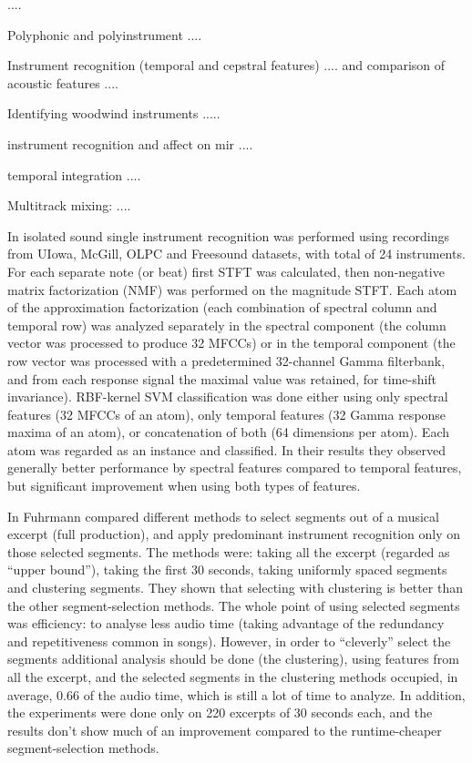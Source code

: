 \documentclass[journal]{IEEEtran}
\begin{document}
\cite{martin1998musical,yu2014sparse}....

Polyphonic and polyinstrument \cite{hamel2009automatic}....

Instrument recognition (temporal and cepstral features) \cite{eronen2000musical}.... and comparison of acoustic features \cite{eronen2001comparison}....

Identifying woodwind instruments \cite{brown2001feature}.....

instrument recognition and affect on mir \cite{kitahara2007computational}....

temporal integration \cite{Joder:09}....

Multitrack mixing: \cite{scottinstrument,scott2011automatic}....

In \cite{tjoa2010musical} isolated sound single instrument recognition was performed using recordings from UIowa, McGill, OLPC and Freesound datasets, with total of 24 instruments.
For each separate note (or beat) first STFT was calculated, then non-negative matrix factorization (NMF) was performed on the magnitude STFT. Each atom of the approximation factorization (each combination of spectral column and temporal row) was analyzed separately in the spectral component (the column vector was processed to produce 32 MFCCs) or in the temporal component (the row vector was processed with a predetermined 32-channel Gamma filterbank, and from each response signal the maximal value was retained, for time-shift invariance). RBF-kernel SVM classification was done either using only spectral features (32 MFCCs of an atom), only temporal features (32 Gamma response maxima of an atom), or concatenation of both (64 dimensions per atom). Each atom was regarded as an instance and classified.
In their results they observed generally better performance by spectral features compared to temporal features, but significant improvement when using both types of features.

In \cite{fuhrmann2011quantifying} Fuhrmann \etal compared different methods to select segments out of a musical excerpt (full production), and apply predominant instrument recognition only on those selected segments. The methods were: taking all the excerpt (regarded as ``upper bound''), taking the first 30 seconds, taking uniformly spaced segments and clustering segments. They shown that selecting with clustering is better than the other segment-selection methods. The whole point of using selected segments was efficiency: to analyse less audio time (taking advantage of the redundancy and repetitiveness common in songs). However, in order to ``cleverly'' select the segments additional analysis should be done (the clustering), using features from all the excerpt, and the selected segments in the clustering methods occupied, in average, 0.66 of the audio time, which is still a lot of time to analyze. In addition, the experiments were done only on 220 excerpts of 30 seconds each, and the results don't show much of an improvement compared to the runtime-cheaper segment-selection methods.
\end{document}
